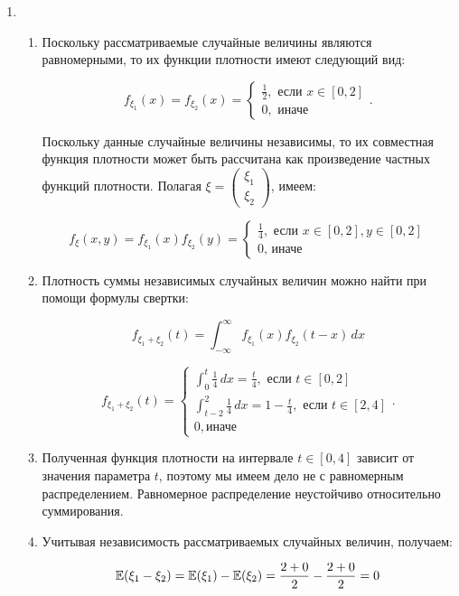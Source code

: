 \begin{enumerate}
\item 

\begin{enumerate}
\item Поскольку рассматриваемые случайные величины являются равномерными, 
то их функции плотности имеют следующий вид:

\[
f_{\xi_{1}}(x)=f_{\xi_{2}}(x)=
\begin{cases}
\frac{1}{2}, \text{ если }x\in[0,2]\\
0, \text{ иначе}
\end{cases}.
\]

Поскольку данные случайные величины независимы, 
то их совместная функция плотности может быть рассчитана как произведение частных функций плотности. 
Полагая 
$\xi=
\begin{pmatrix}
\xi_{1} \\ 
\xi_{2}
\end{pmatrix}
$, 
имеем:

\[
f_{\xi}(x,y)=f_{\xi_{1}}(x)f_{\xi_{2}}(y)=
\begin{cases}\frac{1}{4}, \text{ если } x\in[0,2], y\in[0,2]\\
0\text{, иначе}
\end{cases}
\]

\item Плотность суммы независимых случайных величин можно найти при помощи формулы свертки:

\[
f_{\xi_{1}+\xi_{2}}(t)=\int_{-\infty}^{\infty}f_{\xi_{1}}(x)f_{\xi_{2}}(t-x)\, dx
\]


\[
f_{\xi_{1}+\xi_{2}}(t)=
\begin{cases}
\int_{0}^{t} \frac{1}{4} \, dx = \frac{t}{4}, \text{ если } t \in [0,2] \\ 
\int_{t-2}^{2} \frac{1}{4} \, dx = 1-\frac{t}{4}, \text{ если } t \in [2,4] \\
0, \text{иначе}
\end{cases}.
\]

\item Полученная функция плотности на интервале $t \in [0,4]$ зависит от значения параметра $t$, 
поэтому мы имеем дело не с равномерным распределением. 
Равномерное распределение неустойчиво относительно суммирования. 

\item Учитывая независимость рассматриваемых случайных величин, получаем:

\[
\operatorname{\mathbb{E}}(\xi_{1}-\xi_{2}) = \operatorname{\mathbb{E}}(\xi_{1})-\operatorname{\mathbb{E}}(\xi_{2}) = \frac{2+0}{2} - \frac{2+0}{2} = 0
\]


\end{enumerate}
\end{enumerate}
